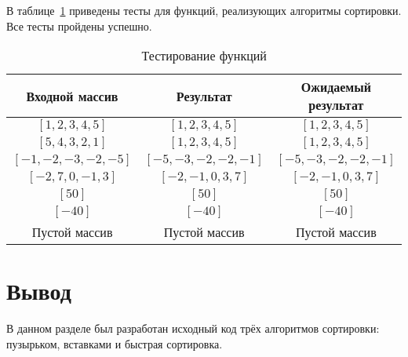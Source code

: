 

В таблице~\ref{tbl:test} приведены тесты для функций, реализующих алгоритмы сортировки.
Все тесты пройдены успешно.

\begin{table}[h!]
    \begin{center}
        \begin{threeparttable}
            \captionsetup{justification=raggedright,singlelinecheck=off}
            \caption{\label{tbl:test}Тестирование функций}
            \begin{tabular}{|c|c|c|}
                \hline
                Входной массив & Результат & Ожидаемый результат \\
                \hline
                $[1, 2, 3, 4, 5]$ & $[1, 2, 3, 4, 5]$  & $[1, 2, 3, 4, 5]$\\\hline
                $[5, 4, 3, 2, 1]$  & $[1, 2, 3, 4, 5]$ & $[1, 2, 3, 4, 5]$\\\hline
                $[-1, -2, -3, -2, -5]$  & $[-5, -3, -2, -2, -1]$  & $[-5, -3, -2, -2, -1]$\\\hline
                $[-2, 7, 0, -1, 3]$  & $[-2, -1, 0, 3, 7]$  & $[-2, -1, 0, 3, 7]$\\\hline
                $[50]$  & $[50]$  & $[50]$\\\hline
                $[-40]$  & $[-40]$  & $[-40]$\\\hline
                Пустой массив  & Пустой массив  & Пустой массив\\
                \hline
            \end{tabular}
        \end{threeparttable}
    \end{center}
\end{table}

\section*{Вывод}

В данном разделе был разработан исходный код трёх алгоритмов сортировки: пузырьком, вставками и быстрая сортировка.

